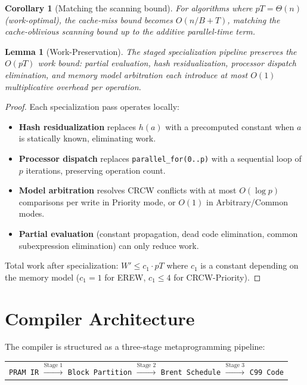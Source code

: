 \documentclass[11pt]{article}
\newtheorem{lemma}[theorem]{Lemma}
\newtheorem{corollary}[theorem]{Corollary}
\begin{document}
\begin{corollary}[Matching the scanning bound]
\label{cor:scanning}
For algorithms where $pT = \Theta(n)$ (work-optimal), the cache-miss
bound becomes $O(n/B + T)$, matching the cache-oblivious scanning bound
up to the additive parallel-time term.
\end{corollary}

\begin{lemma}[Work-Preservation]
\label{lem:work-preservation}
The staged specialization pipeline preserves the $O(pT)$ work bound:
partial evaluation, hash residualization, processor dispatch elimination,
and memory model arbitration each introduce at most $O(1)$ multiplicative
overhead per operation.
\end{lemma}

\begin{proof}
Each specialization pass operates locally:
\begin{itemize}
\item \textbf{Hash residualization} replaces $h(a)$ with a precomputed
  constant when $a$ is statically known, eliminating work.
\item \textbf{Processor dispatch} replaces \texttt{parallel\_for(0..p)}
  with a sequential loop of $p$ iterations, preserving operation count.
\item \textbf{Model arbitration} resolves CRCW conflicts with at most
  $O(\log p)$ comparisons per write in Priority mode, or $O(1)$ in
  Arbitrary/Common modes.
\item \textbf{Partial evaluation} (constant propagation, dead code
  elimination, common subexpression elimination) can only reduce work.
\end{itemize}
Total work after specialization: $W' \le c_1 \cdot pT$ where $c_1$ is a
constant depending on the memory model ($c_1 = 1$ for EREW, $c_1 \le 4$
for CRCW-Priority).
\end{proof}


\section{Compiler Architecture}
\label{sec:compiler}

The compiler is structured as a three-stage metaprogramming pipeline:

\begin{center}
\begin{tabular}{c}
\texttt{PRAM IR} $\xrightarrow{\text{Stage 1}}$
\texttt{Block Partition} $\xrightarrow{\text{Stage 2}}$
\texttt{Brent Schedule} $\xrightarrow{\text{Stage 3}}$
\texttt{C99 Code}
\end{tabular}
\end{center}
\end{document}
